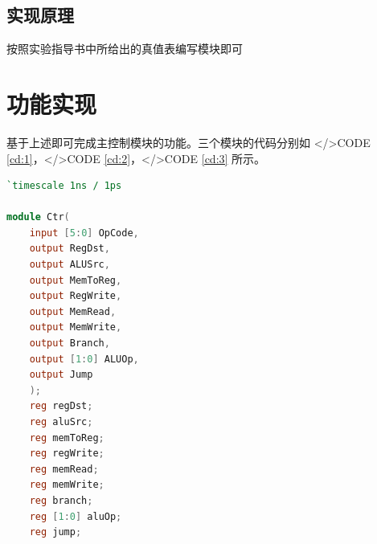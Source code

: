 \documentclass{progartcn}
\begin{document}
\subsection{实现原理}

按照实验指导书中所给出的真值表编写模块即可

\section{功能实现}

基于上述即可完成主控制模块的功能。三个模块的代码分别如 </>CODE \ref{cd:1}，</>CODE \ref{cd:2}，</>CODE \ref{cd:3} 所示。

\begin{lstlisting}[language=verilog,caption={Ctr.v},label={cd:1}]
`timescale 1ns / 1ps 

module Ctr(
    input [5:0] OpCode,
    output RegDst,
    output ALUSrc,
    output MemToReg,
    output RegWrite,
    output MemRead,
    output MemWrite,
    output Branch,
    output [1:0] ALUOp,
    output Jump
    );
    reg regDst;
    reg aluSrc;
    reg memToReg;
    reg regWrite;
    reg memRead;
    reg memWrite;
    reg branch;
    reg [1:0] aluOp;
    reg jump;
    

\end{lstlisting}
\end{document}
